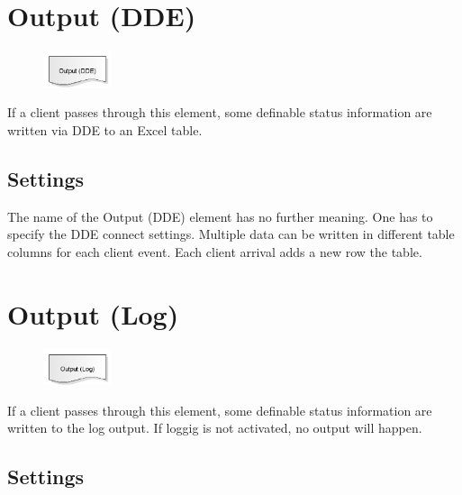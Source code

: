 \section{Output (DDE)}
\label{ref:ModelElementOutputDDE}

\begin{figure}
\vspace{-22pt}
\includegraphics[width=2cm]{imageModelElementOutputDDE.png}
\vspace{-22pt}
\end{figure}

If a client passes through this element, some definable status information are written via DDE to an Excel table.

\subsection*{Settings}

The name of the Output (DDE) element has no further meaning. One has to specify the DDE connect settings.  
Multiple data can be written in different table columns for each client event. Each client arrival
adds a new row the table.


\section{Output (Log)}
\label{ref:ModelElementOutputLog}

\begin{figure}
\vspace{-22pt}
\includegraphics[width=2cm]{imageModelElementOutputLog.png}
\vspace{-22pt}
\end{figure}

If a client passes through this element, some definable status information are written to the log output.
If loggig is not activated, no output will happen.

\subsection*{Settings}

